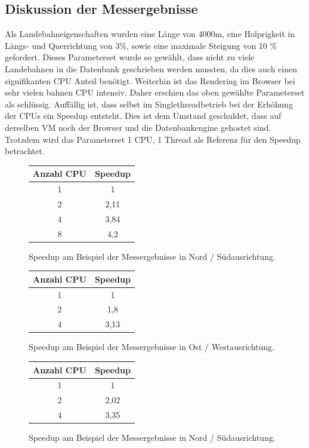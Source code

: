 \documentclass[10pt,a4paper]{report}
\begin{document}
\subsection{Diskussion der Messergebnisse}

Als Landebahneigenschaften wurden eine Länge von 4000m, eine Holprigkeit in Längs- und Querrichtung von 3\%, sowie eine maximale Steigung von 10 \% gefordert. Dieses Parameterset wurde so gewählt, dass nicht zu viele Landebahnen in die Datenbank geschrieben werden mussten, da dies auch einen signifikanten CPU Anteil benötigt. Weiterhin ist das Rendering im Browser bei sehr vielen bahnen CPU intensiv. Daher erschien das oben gewählte Parameterset als schlüssig.
Auffällig ist, dass selbst im Singlethreadbetrieb bei der Erhöhung der CPUs ein Speedup entsteht. Dies ist dem Umstand geschuldet, dass auf derselben VM noch der Browser und die Datenbankengine gehostet sind.
Trotzdem wird das Parameterset 1 CPU, 1 Thread als Referenz für den Speedup betrachtet.

\begin{figure}
\begin{tabular}{|c|c|}
 \hline 
 Anzahl CPU & Speedup \\ 
 \hline 
 1 & 1 \\ 
 \hline 
 2 & 2,11 \\ 
 \hline 
 4 & 3,84 \\ 
 \hline 
  8 & 4,2 \\ 
 \hline 
 \end{tabular}  
 \caption{Speedup am Beispiel der Messergebnisse in Nord / Südausrichtung.}
\end{figure}

\begin{figure}
\begin{tabular}{|c|c|}
 \hline 
 Anzahl CPU & Speedup \\ 
 \hline 
 1 & 1 \\ 
 \hline 
 2 & 1,8 \\ 
 \hline 
 4 & 3,13 \\ 
 \hline 
 \end{tabular}  
 \caption{Speedup am Beispiel der Messergebnisse in Ost / Westausrichtung.}
\end{figure}

\begin{figure}
\begin{tabular}{|c|c|}
 \hline 
 Anzahl CPU & Speedup \\ 
 \hline 
 1 & 1 \\ 
 \hline 
 2 & 2,02 \\ 
 \hline 
 4 & 3,35 \\ 
 \hline 
 \end{tabular}  
 \caption{Speedup am Beispiel der Messergebnisse in Nord / Südausrichtung.}
\end{figure}
\end{document}
